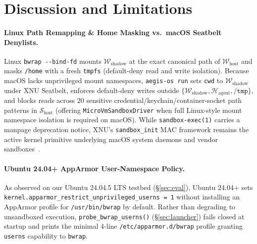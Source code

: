 \documentclass[10pt,twocolumn]{article}
\begin{document}
\section{Discussion and Limitations}
\label{sec:discussion}

\paragraph{Linux Path Remapping \& Home Masking vs.\ macOS Seatbelt Denylists.}
Linux \texttt{bwrap -\/-bind-fd} mounts $\mathcal{W}_{\text{shadow}}$ at the exact canonical path of $\mathcal{W}_{\text{host}}$ and masks \texttt{/home} with a fresh \texttt{tmpfs} (default-deny read and write isolation). Because macOS lacks unprivileged mount namespaces, \texttt{aegis-os run} sets \texttt{cwd} to $\mathcal{W}_{\text{shadow}}$ under XNU Seatbelt, enforces default-deny writes outside $\{\mathcal{W}_{\text{shadow}}, \mathcal{H}_{\text{agent}}, \texttt{/tmp}\}$, and blocks reads across 20 sensitive credential/keychain/container-socket path patterns in $\mathcal{S}_{\text{host}}$ (offering \texttt{MicroVmSandboxDriver} when full Linux-style mount namespace isolation is required on macOS). While \texttt{sandbox-exec(1)} carries a manpage deprecation notice, XNU's \texttt{sandbox\_init} MAC framework remains the active kernel primitive underlying macOS system daemons and vendor sandboxes~\cite{anthropic2025srt,openai2025codex}.

\paragraph{Ubuntu 24.04+ AppArmor User-Namespace Policy.}
As observed on our Ubuntu 24.04.5 LTS testbed (\S\ref{sec:eval}), Ubuntu 24.04+ sets \texttt{kernel.apparmor\_restrict\_unprivileged\_userns = 1} without installing an AppArmor profile for \texttt{/usr/bin/bwrap} by default. Rather than degrading to unsandboxed execution, \texttt{probe\_bwrap\_userns()} (\S\ref{sec:launcher}) fails closed at startup and prints the minimal 4-line \texttt{/etc/apparmor.d/bwrap} profile granting \texttt{userns} capability to \texttt{bwrap}.
\end{document}
